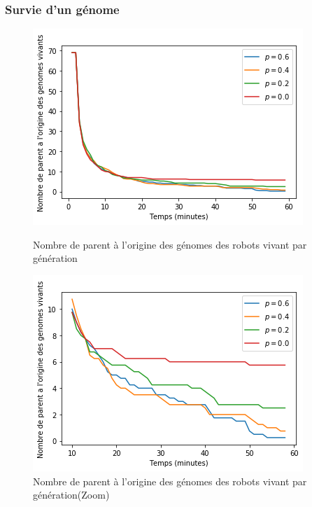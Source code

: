 \documentclass[a4paper]{article}
\begin{document}
\subsubsection{Survie d'un génome}
\begin{figure}[h]
	\begin{minipage}[c]{.46\linewidth}
		\centering
		\includegraphics[width=1.1\linewidth]{../../script_results/parent_origine_medea_full.png}
		\caption{Nombre de parent à l'origine des génomes des robots vivant par génération}
	\end{minipage}
	\hfill
	\begin{minipage}[c]{.46\linewidth}
		\centering
		\includegraphics[width=1.1\linewidth]{../../script_results/parent_origine_medea_zoom.png}
		\caption{Nombre de parent à l'origine des génomes des robots vivant par génération(Zoom)}
	\end{minipage}
\end{figure}
\end{document}
